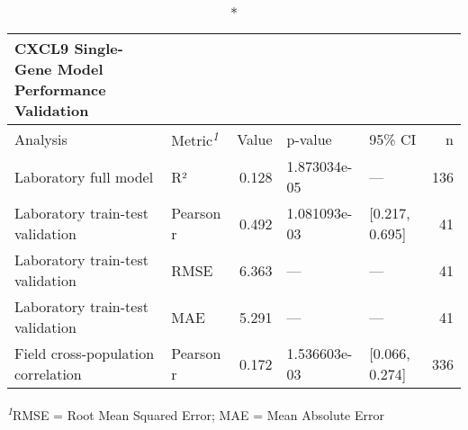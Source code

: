 \setlength{\LTpost}{0mm}
\begin{longtable}{llrllr}
\caption*{
{\large CXCL9 Single-Gene Model Performance Validation}
} \\ 
\toprule
Analysis & Metric\textsuperscript{\textit{1}} & Value & p-value & 95\% CI & n \\ 
\midrule\addlinespace[2.5pt]
Laboratory full model & R² & 0.128 & 1.873034e-05 & — & 136 \\ 
Laboratory train-test validation & Pearson r & 0.492 & 1.081093e-03 & [0.217, 0.695] & 41 \\ 
Laboratory train-test validation & RMSE & 6.363 & — & — & 41 \\ 
Laboratory train-test validation & MAE & 5.291 & — & — & 41 \\ 
Field cross-population correlation & Pearson r & 0.172 & 1.536603e-03 & [0.066, 0.274] & 336 \\ 
\bottomrule
\end{longtable}
\begin{minipage}{\linewidth}
\textsuperscript{\textit{1}}RMSE = Root Mean Squared Error; MAE = Mean Absolute Error\\
\end{minipage}

